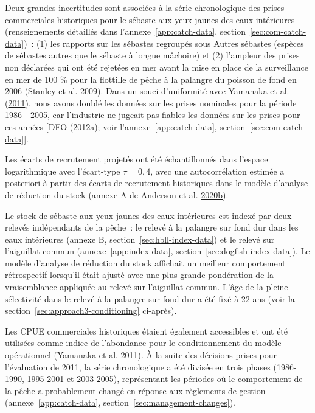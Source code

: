 \documentclass[french,11pt]{book}
\begin{document}
Deux grandes incertitudes sont associées à la série chronologique des prises commerciales historiques pour le sébaste aux yeux jaunes des eaux intérieures (renseignements détaillés dans l'annexe~\ref{app:catch-data}, section~\ref{sec:com-catch-data})~: (1) les rapports sur les sébastes regroupés sous Autres sébastes (espèces de sébastes autres que le sébaste à longue mâchoire) et (2) l'ampleur des prises non déclarées qui ont été rejetées en mer avant la mise en place de la surveillance en mer de 100 \% pour la flottille de pêche à la palangre du poisson de fond en 2006 (Stanley et al. \protect\hyperlink{ref-stanley2009}{2009}). Dans un souci d'uniformité avec Yamanaka et al. (\protect\hyperlink{ref-yamanaka2011}{2011}), nous avons doublé les données sur les prises nominales pour la période 1986---2005, car l'industrie ne jugeait pas fiables les données sur les prises pour ces années {[}DFO (\protect\hyperlink{ref-dfo2012}{2012}\protect\hyperlink{ref-dfo2012}{a}); voir l'annexe~\ref{app:catch-data}, section~\ref{sec:com-catch-data}{]}.

Les écarts de recrutement projetés ont été échantillonnés dans l'espace logarithmique avec l'écart-type \(\tau = 0,4\), avec une autocorrélation estimée a posteriori à partir des écarts de recrutement historiques dans le modèle d'analyse de réduction du stock (annexe A de Anderson et al. \protect\hyperlink{ref-anderson2020gfmp}{2020}\protect\hyperlink{ref-anderson2020gfmp}{b}).

Le stock de sébaste aux yeux jaunes des eaux intérieures est indexé par deux relevés indépendants de la pêche~: le relevé à la palangre sur fond dur dans les eaux intérieures (annexe B, section~\ref{sec:hbll-index-data}) et le relevé sur l'aiguillat commun (annexe~\ref{app:index-data}, section~\ref{sec:dogfish-index-data}). Le modèle d'analyse de réduction du stock affichait un meilleur comportement rétrospectif lorsqu'il était ajusté avec une plus grande pondération de la vraisemblance appliquée au relevé sur l'aiguillat commun. L'âge de la pleine sélectivité dans le relevé à la palangre sur fond dur a été fixé à 22 ans (voir la section~\ref{sec:approach3-conditioning} ci-après).

Les CPUE commerciales historiques étaient également accessibles et ont été utilisées comme indice de l'abondance pour le conditionnement du modèle opérationnel (Yamanaka et al. \protect\hyperlink{ref-yamanaka2011}{2011}). À la suite des décisions prises pour l'évaluation de 2011, la série chronologique a été divisée en trois phases (1986-1990, 1995-2001 et 2003-2005), représentant les périodes où le comportement de la pêche a probablement changé en réponse aux règlements de gestion (annexe~\ref{app:catch-data}, section~\ref{sec:management-changes}).
\end{document}
